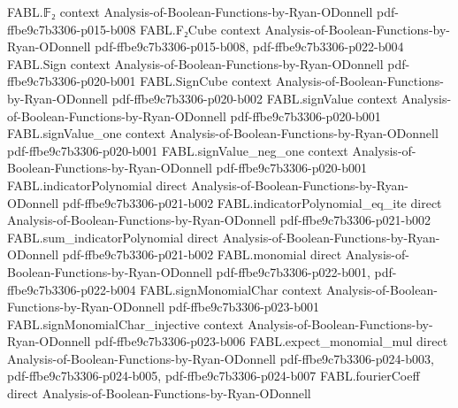 \begin{theorem}
\label{FABL.hastadAcceptanceProbability_le_half_add_half_sqrt}
\leanok
{}
\proofstep
  {FABL.𝔽₂}
  {context}
  {Analysis-of-Boolean-Functions-by-Ryan-ODonnell}
  {pdf-ffbe9c7b3306-p015-b008}
\proofstep
  {FABL.F₂Cube}
  {context}
  {Analysis-of-Boolean-Functions-by-Ryan-ODonnell}
  {pdf-ffbe9c7b3306-p015-b008,
    pdf-ffbe9c7b3306-p022-b004}
\proofstep
  {FABL.Sign}
  {context}
  {Analysis-of-Boolean-Functions-by-Ryan-ODonnell}
  {pdf-ffbe9c7b3306-p020-b001}
\proofstep
  {FABL.SignCube}
  {context}
  {Analysis-of-Boolean-Functions-by-Ryan-ODonnell}
  {pdf-ffbe9c7b3306-p020-b002}
\proofstep
  {FABL.signValue}
  {context}
  {Analysis-of-Boolean-Functions-by-Ryan-ODonnell}
  {pdf-ffbe9c7b3306-p020-b001}
\proofstep
  {FABL.signValue_one}
  {context}
  {Analysis-of-Boolean-Functions-by-Ryan-ODonnell}
  {pdf-ffbe9c7b3306-p020-b001}
\proofstep
  {FABL.signValue_neg_one}
  {context}
  {Analysis-of-Boolean-Functions-by-Ryan-ODonnell}
  {pdf-ffbe9c7b3306-p020-b001}
\proofstep
  {FABL.indicatorPolynomial}
  {direct}
  {Analysis-of-Boolean-Functions-by-Ryan-ODonnell}
  {pdf-ffbe9c7b3306-p021-b002}
\proofstep
  {FABL.indicatorPolynomial_eq_ite}
  {direct}
  {Analysis-of-Boolean-Functions-by-Ryan-ODonnell}
  {pdf-ffbe9c7b3306-p021-b002}
\proofstep
  {FABL.sum_indicatorPolynomial}
  {direct}
  {Analysis-of-Boolean-Functions-by-Ryan-ODonnell}
  {pdf-ffbe9c7b3306-p021-b002}
\proofstep
  {FABL.monomial}
  {direct}
  {Analysis-of-Boolean-Functions-by-Ryan-ODonnell}
  {pdf-ffbe9c7b3306-p022-b001,
    pdf-ffbe9c7b3306-p022-b004}
\proofstep
  {FABL.signMonomialChar}
  {context}
  {Analysis-of-Boolean-Functions-by-Ryan-ODonnell}
  {pdf-ffbe9c7b3306-p023-b001}
\proofstep
  {FABL.signMonomialChar_injective}
  {context}
  {Analysis-of-Boolean-Functions-by-Ryan-ODonnell}
  {pdf-ffbe9c7b3306-p023-b006}
\proofstep
  {FABL.expect_monomial_mul}
  {direct}
  {Analysis-of-Boolean-Functions-by-Ryan-ODonnell}
  {pdf-ffbe9c7b3306-p024-b003,
    pdf-ffbe9c7b3306-p024-b005,
    pdf-ffbe9c7b3306-p024-b007}
\proofstep
  {FABL.fourierCoeff}
  {direct}
  {Analysis-of-Boolean-Functions-by-Ryan-ODonnell}

\end{theorem}
